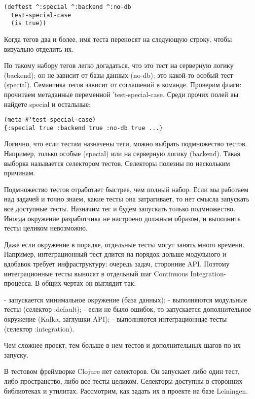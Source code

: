 \begin{verbatim}
(deftest ^:special ^:backend ^:no-db
  test-special-case
  (is true))
\end{verbatim}

Когда тегов два и более, имя теста переносят на следующую строку, чтобы
визуально отделить их.

По такому набору тегов легко догадаться, что это тест на серверную логику
(backend); он не зависит от базы данных (no-db); это какой-то особый тест
(special). Семантика тегов зависит от соглашений в команде. Проверим флаги:
прочитаем метаданные переменной 'test-special-case. Среди прочих полей вы
найдете special и остальные:

\begin{verbatim}
(meta #'test-special-case)
{:special true :backend true :no-db true ...}
\end{verbatim}

Логично, что если тестам назначены теги, можно выбрать подмножество
тестов. Например, только особые (special) или на серверную логику
(backend). Такая выборка называется селектором тестов. Селекторы полезны по
нескольким причинам.

Подмножество тестов отработает быстрее, чем полный набор. Если мы работаем над
задачей и точно знаем, какие тесты она затрагивает, то нет смысла запускать все
доступные тесты. Назначим тег и будем запускать только подмножество. Иногда
окружение разработчика не настроено должным образом, и выполнить тесты целиком
невозможно.

Даже если окружение в порядке, отдельные тесты могут занять много
времени. Например, интеграционный тест длится на порядок дольше модульного и
вдобавок требует инфраструктуру: очередь задач, сторонние API. Поэтому
интеграционные тесты выносят в отдельный шаг Continuous Integration-процесса. В
общих чертах он выглядит так:

- запускается минимальное окружение (база данных);
- выполняются модульные тесты (селектор :default);
- если не было ошибок, то запускается дополнительное окружение (Kafka, заглушки
  API);
- выполняются интеграционные тесты (селектор :integration).

Чем сложнее проект, тем больше в нем тестов и дополнительных шагов по их
запуску.

В тестовом фреймворке Clojure нет селекторов. Он запускает либо один тест, либо
пространство, либо все тесты целиком. Селекторы доступны в сторонних библиотеках
и утилитах. Рассмотрим, как задать их в проекте на базе Leiningen.

